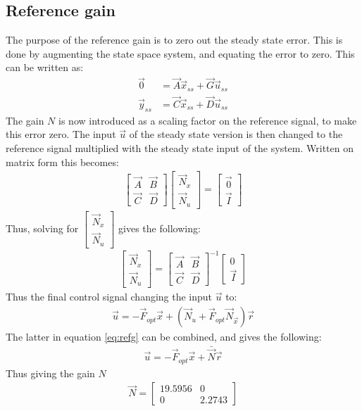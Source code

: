 \subsection{Reference gain}
The purpose of the reference gain is to zero out the steady state error. This is done by augmenting the state space system, and equating the error to zero. This can be written as:
\begin{align}
\vec{0} &= \vec{A}\vec{x}_{ss} + \vec{G}\vec{u}_{ss}\\
\vec{y}_{ss} &= \vec{C}\vec{x}_{ss} + \vec{D}\vec{u}_{ss}
\end{align}
The gain $N$ is now introduced as a scaling factor on the reference signal, to make this error zero. The input $\vec{u}$ of the steady state version is then changed to the reference signal multiplied with the steady state input of the system. Written on matrix form this becomes:
\begin{align}
\begin{bmatrix}
\vec{A} & \vec{B}\\
\vec{C} & \vec{D}
\end{bmatrix}\begin{bmatrix}
\vec{N}_x\\
\vec{N}_u
\end{bmatrix} = \begin{bmatrix}
\vec{0}\\
\vec{I}
\end{bmatrix}
\end{align}
Thus, solving for $\begin{bmatrix} \vec{N}_x\\ \vec{N}_u \end{bmatrix}$ gives the following:
\begin{align}
\begin{bmatrix}
\vec{N}_x\\
\vec{N}_u
\end{bmatrix} =
\begin{bmatrix}
\vec{A} & \vec{B}\\
\vec{C} & \vec{D}
\end{bmatrix}^{-1}
\begin{bmatrix}
0\\
\vec{I}
\end{bmatrix}
\end{align}
Thus the final control signal changing the input $\vec{u}$ to:
\begin{align}
\vec{u} = -\vec{F}_{opt}\vec{x} + (\vec{N}_u + \vec{F}_{opt}\vec{N}_{\vec{x}})\vec{r}
\label{eq:refg}
\end{align}
The latter in equation \vref{eq:refg} can be combined, and gives the following:
\begin{align}
\vec{u} = -\vec{F}_{opt}\vec{x} + \bar{\vec{N}}\vec{r}
\end{align}
Thus giving the gain $N$
\begin{align}
\vec{N} = \begin{bmatrix}
19.5956 & 0\\
0 & 2.2743
\end{bmatrix}
\end{align}


